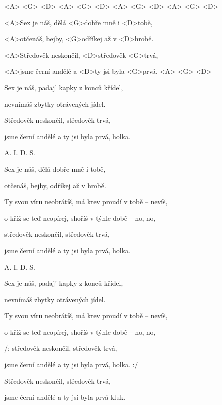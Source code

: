 

<A> <G> <D> <A> <G> <D> <A> <G> <D> <A> <G> <D>

\zs
<A>Sex je náš, dělá <G>dobře mně i <D>tobě,

<A>otčenáš, bejby, <G>odříkej až v <D>hrobě.

<A>Středověk neskončil, <D>středověk <G>trvá,

<A>jsme černí andělé a <D>ty jsi byla <G>prvá. <A> 
<G> <D>
\ks

\zs
Sex je náš, padaj' kapky z konců křídel,

nevnímáš zbytky otrávených jídel.

Středověk neskončil, středověk trvá,

jsme černí andělé a ty jsi byla prvá, holka.
\ks

A. I. D. S.

\zs
Sex je náš, dělá dobře mně i tobě,

otčenáš, bejby, odříkej až v hrobě.

Ty svou víru neobrátíš, má krev proudí v tobě -- nevíš,

o kříž se teď neopírej, shoříš v týhle době -- no, no,

středověk neskončil, středověk trvá,

jsme černí andělé a ty jsi byla prvá, holka.
\ks

A. I. D. S.

\zs
Sex je náš, padaj' kapky z konců křídel,

nevnímáš zbytky otrávených jídel.

Ty svou víru neobrátíš, má krev proudí v tobě -- nevíš,

o kříž se teď neopírej, shoříš v týhle době -- no, no,

/: středověk neskončil, středověk trvá,

jsme černí andělé a ty jsi byla prvá, holka. :/

Středověk neskončil, středověk trvá,

jsme černí andělé a ty jsi byla prvá kluk.
\ks

\kp
